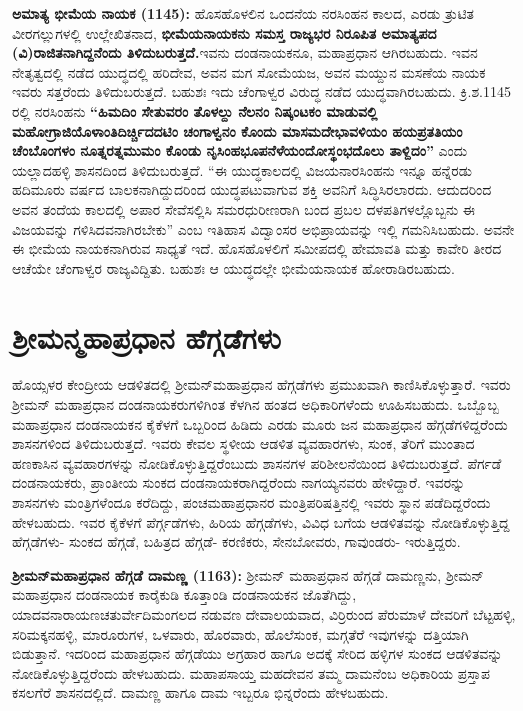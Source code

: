 \textbf{ಅಮಾತ್ಯ ಭೀಮೆಯ ನಾಯಕ (1145):} ಹೊಸಹೊಳಲಿನ ಒಂದನೆಯ ನರಸಿಂಹನ ಕಾಲದ, ಎರಡು ತ್ರುಟಿತ ವೀರಗಲ್ಲುಗಳಲ್ಲಿ ಉಲ್ಲೇಖಿತನಾದ,\textbf{ ಭೀಮೆಯನಾಯಕನು ಸಮಸ್ತ ರಾಜ್ಯಭರ ನಿರೂಪಿತ ಅಮಾತ್ಯಪದ (ವಿ)ರಾಜಿತನಾಗಿದ್ದನೆಂದು ತಿಳಿದುಬರುತ್ತದೆ.}ಇವನು ದಂಡನಾಯಕನೂ, ಮಹಾಪ್ರಧಾನ ಆಗಿರಬಹುದು. ಇವನ ನೇತೃತ್ವದಲ್ಲಿ ನಡೆದ ಯುದ್ಧದಲ್ಲಿ ಹರಿದೇವ, ಅವನ ಮಗ ಸೋಮೆಯಜ, ಅವನ ಮಯ್ದುನ ಮಸಣೆಯ ನಾಯಕ ಇವರು ಸತ್ತರೆಂದು ತಿಳಿದುಬರುತ್ತದೆ. ಬಹುಶಃ ಇದು ಚೆಂಗಾಳ್ವರ ವಿರುದ್ಧ ನಡೆದ ಯುದ್ಧವಾಗಿರಬಹುದು. ಕ್ರಿ.ಶ.1145 ರಲ್ಲಿ ನರಸಿಂಹನು \textbf{“ಹಿಮದಿಂ ಸೇತುವರಂ ತೊಳಲ್ದು ನೆಲನಂ ನಿಷ್ಕಂಟಕಂ ಮಾಡುವಲ್ಲಿ ಮಹೋಗ್ರಾಜಿಯೊಳಾಂತಿದಿರ್ಚ್ಚಿದದಟಿಂ ಚಂಗಾಳ್ವನಂ ಕೊಂದು ಮಾಸಮದೇಭಾವಳಿಯಂ ಹಯಪ್ರತತಿಯಂ ಚೆಂಬೊಂಗಳಂ ನೂತ್ನರತ್ನಮುಮಂ ಕೊಂಡು ನೃಸಿಂಹಭೂಪನೆಳೆಯಂದೋಸ್ಥಂಭದೊಲು ತಾಳ್ದಿದಂ”} ಎಂದು ಯಲ್ಲಾದಹಳ್ಳಿ ಶಾಸನದಿಂದ ತಿಳಿದುಬರುತ್ತದೆ. “ಈ ಯುದ್ಧಕಾಲದಲ್ಲಿ ವಿಜಯನಾರಸಿಂಹನು ಇನ್ನೂ ಹನ್ನೆರಡು ಹದಿಮೂರು ವರ್ಷದ ಬಾಲಕನಾಗಿದ್ದುದರಿಂದ ಯುದ್ಧಪಟುವಾಗುವ ಶಕ್ತಿ ಅವನಿಗೆ ಸಿದ್ಧಿಸಿರಲಾರದು. ಆದುದರಿಂದ ಅವನ ತಂದೆಯ ಕಾಲದಲ್ಲಿ ಅಪಾರ ಸೇವೆಸಲ್ಲಿಸಿ ಸಮರಧುರೀಣರಾಗಿ ಬಂದ ಪ್ರಬಲ ದಳಪತಿಗಳಲ್ಲೊಬ್ಬನು ಈ ವಿಜಯವನ್ನು ಗಳಿಸಿದವನಾಗಿರಬೇಕು” ಎಂಬ ಇತಿಹಾಸ ವಿದ್ವಾಂಸರ ಅಭಿಪ್ರಾಯವನ್ನು ಇಲ್ಲಿ ಗಮನಿಸಿಬಹುದು. ಅವನೇ ಈ ಭೀಮೆಯ ನಾಯಕನಾಗಿರುವ ಸಾಧ್ಯತೆ ಇದೆ. ಹೊಸಹೊಳಲಿಗೆ ಸಮೀಪದಲ್ಲಿ ಹೇಮಾವತಿ ಮತ್ತು ಕಾವೇರಿ ತೀರದ ಆಚೆಯೇ ಚೆಂಗಾಳ್ವರ ರಾಜ್ಯವಿದ್ದಿತು. ಬಹುಶಃ ಆ ಯುದ್ಧದಲ್ಲೇ ಭೀಮೆಯನಾಯಕ ಹೋರಾಡಿರಬಹುದು.


\section{ಶ‍್ರೀಮನ್ಮಹಾಪ್ರಧಾನ ಹೆಗ್ಗಡೆಗಳು}

ಹೊಯ್ಸಳರ ಕೇಂದ್ರೀಯ ಆಡಳಿತದಲ್ಲಿ ಶ‍್ರೀಮನ್​ಮಹಾಪ್ರಧಾನ ಹೆಗ್ಗಡೆಗಳು ಪ್ರಮುಖವಾಗಿ ಕಾಣಿಸಿಕೊಳ್ಳುತ್ತಾರೆ. ಇವರು ಶ‍್ರೀಮನ್​ ಮಹಾಪ್ರಧಾನ ದಂಡನಾಯಕರುಗಳಿಗಿಂತ ಕೆಳಗಿನ ಹಂತದ ಅಧಿಕಾರಿಗಳೆಂದು ಊಹಿಸಬಹುದು. ಒಬ್ಬೊಬ್ಬ ಮಹಾಪ್ರಧಾನ ದಂಡನಾಯಕನ ಕೈಕೆಳಗೆ ಒಬ್ಬರಿಂದ ಹಿಡಿದು ಎರಡು ಮೂರು ಜನ ಮಹಾಪ್ರಧಾನ ಹೆಗ್ಗಡೆಗಳಿದ್ದರೆಂದು ಶಾಸನಗಳಿಂದ ತಿಳಿದುಬರುತ್ತದೆ. ಇವರು ಕೇವಲ ಸ್ಥಳೀಯ ಆಡಳಿತ ವ್ಯವಹಾರಗಳು, ಸುಂಕ, ತೆರಿಗೆ ಮುಂತಾದ ಹಣಕಾಸಿನ ವ್ಯವಹಾರಗಳನ್ನು ನೋಡಿಕೊಳ್ಳುತ್ತಿದ್ದರೆಂಬುದು ಶಾಸನಗಳ ಪರಿಶೀಲನೆಯಿಂದ ತಿಳಿದುಬರುತ್ತದೆ. ಪೆರ್ಗಡೆ ದಂಡನಾಯಕರು, ಪ್ರಾಂತೀಯ ಸುಂಕದ ದಂಡನಾಯಕರಾಗಿದ್ದರೆಂದು ನಾಗಯ್ಯನವರು ಹೇಳಿದ್ದಾರೆ. ಇವರನ್ನು ಶಾಸನಗಳು ಮಂತ್ರಿಗಳೆಂದೂ ಕರೆದಿದ್ದು, ಪಂಚಮಹಾಪ್ರಧಾನರ ಮಂತ್ರಿಪರಿಷತ್ತಿನಲ್ಲಿ ಇವರು ಸ್ಥಾನ ಪಡೆದಿದ್ದರೆಂದು ಹೇಳಬಹುದು. ಇವರ ಕೈಕೆಳಗೆ ಪೆರ್ಗ್ಗಡೆಗಳು, ಹಿರಿಯ ಹೆಗ್ಗಡೆಗಳು, ವಿವಿಧ ಬಗೆಯ ಆಡಳಿತವನ್ನು ನೋಡಿಕೊಳ್ಳುತ್ತಿದ್ದ ಹೆಗ್ಗಡೆಗಳು- ಸುಂಕದ ಹೆಗ್ಗಡೆ, ಬಹಿತ್ರದ ಹೆಗ್ಗಡೆ- ಕರಣಿಕರು, ಸೇನಬೋವರು, ಗಾವುಂಡರು- ಇರುತ್ತಿದ್ದರು.

\textbf{ಶ‍್ರೀಮನ್​ಮಹಾಪ್ರಧಾನ ಹೆಗ್ಗಡೆ ದಾಮಣ್ಣ (1163):} ಶ‍್ರೀಮನ್​ ಮಹಾಪ್ರಧಾನ ಹೆಗ್ಗಡೆ ದಾಮಣ್ಣನು, ಶ‍್ರೀಮನ್​ ಮಹಾಪ್ರಧಾನ ದಂಡನಾಯಕ ಕಾರೈಕುಡಿ ಕೂತ್ತಾಂಡಿ ದಂಡನಾಯಕನ ಜೊತೆಗಿದ್ದು, ಯಾದವನಾರಾಯಣ\break ಚತುರ್ವೇದಿಮಂಗಲದ ನಡುವಣ ದೇವಾಲಯವಾದ, ವಿರ್ರಿರುಂದ ಪೆರುಮಾಳೆ ದೇವರಿಗೆ ಬೆಟ್ಟಹಳ್ಳಿ, ಸರಿಮಕ್ಕನಹಳ್ಳಿ, ಮಾರೂರುಗಳ, ಒಳವಾರು, ಹೊರವಾರು, ಹೊಲೆಸುಂಕ, ಮಗ್ಗತೆರೆ ಇವುಗಳನ್ನು ದತ್ತಿಯಾಗಿ ಬಿಡುತ್ತಾನೆ. ಇದರಿಂದ ಮಹಾಪ್ರಧಾನ ಹೆಗ್ಗಡೆಯು ಅಗ್ರಹಾರ ಹಾಗೂ ಅದಕ್ಕೆ ಸೇರಿದ ಹಳ್ಳಿಗಳ ಸುಂಕದ ಆಡಳಿತವನ್ನು ನೋಡಿಕೊಳ್ಳುತ್ತಿದ್ದರೆಂದು ಹೇಳಬಹುದು. ಮಹಾಪಸಾಯ್ತ ಮಹದೇವನ ತಮ್ಮ ದಾಮನೆಂಬ ಅಧಿಕಾರಿಯ ಪ್ರಸ್ತಾಪ ಕಸಲಗೆರೆ ಶಾಸನದಲ್ಲಿದೆ. ದಾಮಣ್ಣ ಹಾಗೂ ದಾಮ ಇಬ್ಬರೂ ಭಿನ್ನರೆಂದು ಹೇಳಬಹುದು.

